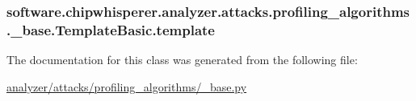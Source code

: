 \subsubsection[{template}]{\setlength{\rightskip}{0pt plus 5cm}software.\+chipwhisperer.\+analyzer.\+attacks.\+profiling\+\_\+algorithms.\+\_\+base.\+Template\+Basic.\+template}\label{classsoftware_1_1chipwhisperer_1_1analyzer_1_1attacks_1_1profiling__algorithms_1_1__base_1_1TemplateBasic_a098b59f986c379acd1b897e27c60a5a8}


The documentation for this class was generated from the following file\+:\begin{DoxyCompactItemize}
\item 
\hyperlink{analyzer_2attacks_2profiling__algorithms_2__base_8py}{analyzer/attacks/profiling\+\_\+algorithms/\+\_\+base.\+py}\end{DoxyCompactItemize}
